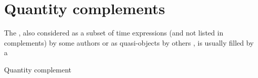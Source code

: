 \documentclass[../main.tex]{subfiles}
\begin{document}
\section{Quantity complements}\label{sec:quantity-complement}

The , also considered as a subset of time expressions (and not listed in complements)
by some authors \citep[-]{po2015chinese} 
or as quasi-objects by others \citep[]{xianhan2004}, is usually filled by a %

Quantity complement 


\cite{huang2008}
\end{document}
